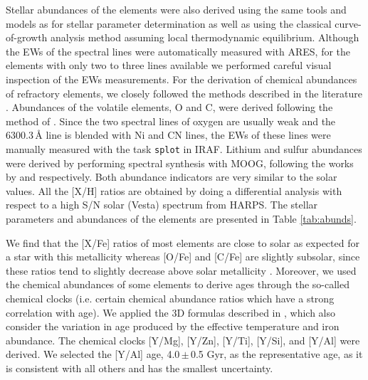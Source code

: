\documentclass[fleqn,usenatbib]{mnras}
\newcommand{\Tstarage}{4.0\,$\pm$\,0.5 Gyr}
\begin{document}
Stellar abundances of the elements were also derived using the same tools and models as for stellar parameter determination as well as using the classical curve-of-growth analysis method assuming local thermodynamic equilibrium. Although the EWs of the spectral lines were automatically measured with ARES, for the elements with only two to three lines available we performed careful visual inspection of the EWs measurements. For the derivation of chemical abundances of refractory elements, we closely followed the methods described in the literature \citep[e.g.][]{Adibekyan-12, Adibekyan-15, Delgado-14, Delgado-17}. Abundances of the volatile elements, O and C, were derived following the method of \cite{Delgado-10, 2015A&A...576A..89B}. Since the two spectral lines of oxygen are usually weak and the 6300.3\,\AA{} line is blended with Ni and CN lines, the EWs of these lines were manually measured with the task \texttt{splot} in IRAF. Lithium and sulfur abundances were derived by performing spectral synthesis with MOOG, following the works by \citet{Delgado-14} and \citet{Costa_Silva2020} respectively. Both abundance indicators are very similar to the solar values.
All the [X/H] ratios are obtained by doing a differential analysis with respect to a high S/N solar (Vesta) spectrum from HARPS. The stellar parameters and abundances of the elements are presented in Table \ref{tab:abunds}. 

We find that the [X/Fe] ratios of most elements are close to solar as expected for a star with this metallicity whereas [O/Fe] and [C/Fe] are slightly subsolar, since these ratios tend to slightly decrease above solar metallicity \cite[e.g.][]{Bertrandelis-15,Franchini2020}. Moreover, we used the chemical abundances of some elements to derive ages through the so-called chemical clocks (i.e. certain chemical abundance ratios which have a strong correlation with age). We applied the 3D formulas described in \citet{Delgado-19}, which also consider the variation in age produced by the effective temperature and iron abundance. The chemical clocks [Y/Mg], [Y/Zn], [Y/Ti], [Y/Si], and [Y/Al] were derived. We selected the [Y/Al] age, \Tstarage{}, as the representative age, as it is consistent with all others and has the smallest uncertainty.
\end{document}
